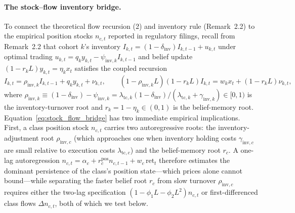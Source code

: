 \paragraph{The stock--flow inventory bridge.} To connect the theoretical flow recursion (2) and inventory rule (Remark~2.2) to the empirical position stocks $n_{c,t}$ reported in regulatory filings, recall from Remark~2.2 that cohort $k$'s inventory $I_{k,t}=(1-\delta_{\mathrm{inv}})I_{k,t-1}+u_{k,t}$ under optimal trading $u_{k,t}=q_k y_{k,t}-\psi_{\mathrm{inv},k}I_{k,t-1}$ and belief update $(1-r_k L)y_{k,t}=\eta_k x_t$ satisfies the coupled recursion
\begin{equation}
I_{k,t}=\rho_{\mathrm{inv},k}I_{k,t-1}+q_k y_{k,t}+\nu_{k,t},\qquad (1-\rho_{\mathrm{inv},k}L)(1-r_k L)I_{k,t}=w_k x_t+(1-r_k L)\nu_{k,t},
\label{eq:stock_flow_bridge}
\end{equation}
where $\rho_{\mathrm{inv},k}\equiv (1-\delta_{\mathrm{inv}})-\psi_{\mathrm{inv},k}=\lambda_{\mathrm{tc},k}(1-\delta_{\mathrm{inv}})/(\lambda_{\mathrm{tc},k}+\gamma_{\mathrm{inv},k})\in[0,1)$ is the inventory-turnover root and $r_k=1-\eta_k\in(0,1)$ is the belief-memory root. Equation~\eqref{eq:stock_flow_bridge} has two immediate empirical implications. First, a class position stock $n_{c,t}$ carries two autoregressive roots: the inventory-adjustment root $\rho_{\mathrm{inv},c}$ (which approaches one when inventory holding costs $\gamma_{\mathrm{inv},c}$ are small relative to execution costs $\lambda_{\mathrm{tc},c}$) and the belief-memory root $r_c$. A one-lag autoregression $n_{c,t}=\alpha_c+r_c^{\mathrm{pos}}n_{c,t-1}+w_c\,\mathrm{ret}_t$ therefore estimates the dominant persistence of the class's position state---which prices alone cannot bound---while separating the faster belief root $r_c$ from slow turnover $\rho_{\mathrm{inv},c}$ requires either the two-lag specification $(1-\phi_1 L-\phi_2 L^2)n_{c,t}$ or first-differenced class flows $\Delta n_{c,t}$, both of which we test below.


